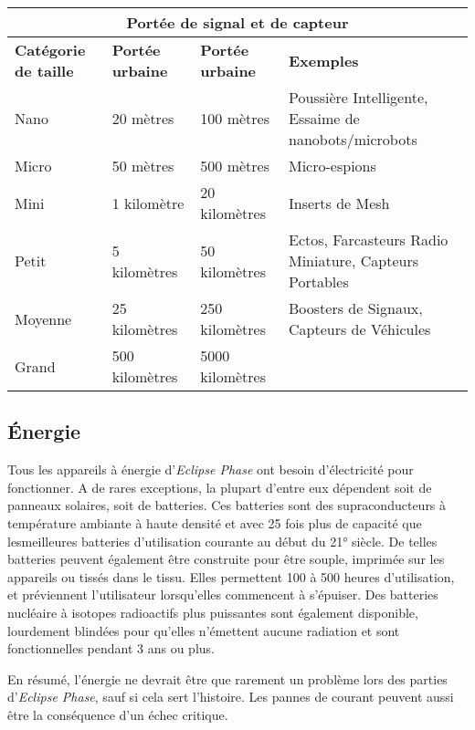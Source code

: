 \begin{table} \begin{tabularx}{\textwidth}{|l|l|l|X|} \hline

\multicolumn{4}{|c|}{\textbf{Portée de signal et de capteur}}	\\ \hline

\textbf{Catégorie de taille}	&\textbf{Portée urbaine}	&\textbf{Portée urbaine}	&\textbf{Exemples} \\ \hline

Nano &20 mètres &100 mètres	&Poussière Intelligente, Essaime de nanobots/microbots \\ Micro	&50 mètres	&500 mètres	&Micro-espions \\ Mini	&1 kilomètre	&20 kilomètres	&Inserts de Mesh\\ Petit	&5 kilomètres	&50 kilomètres	&Ectos, Farcasteurs Radio Miniature, Capteurs Portables \\ Moyenne	&25 kilomètres	&250 kilomètres	&Boosters de Signaux, Capteurs de Véhicules \\ Grand	&500 kilomètres	&5000 kilomètres	&\\ \hline

\end{tabularx} \label{tab:radio-sensor-ranges} \end{table} 

\subsection{Énergie} \label{sec:power} 

Tous les appareils à énergie d'\emph{Eclipse Phase} ont besoin d'électricité pour fonctionner. A de rares exceptions, la plupart d'entre eux dépendent soit de panneaux solaires, soit de batteries. Ces batteries sont des supraconducteurs à température ambiante à haute densité et avec 25 fois plus de capacité que lesmeilleures batteries d'utilisation courante au début du 21° siècle. De telles batteries peuvent également être construite pour être souple, imprimée sur les appareils ou tissés dans le tissu. Elles permettent 100 à 500 heures d'utilisation, et préviennent l'utilisateur lorsqu'elles commencent à s'épuiser. Des batteries nucléaire à isotopes radioactifs plus puissantes sont également disponible, lourdement blindées pour qu'elles n'émettent aucune radiation et sont fonctionnelles pendant 3 ans ou plus. 

En résumé, l'énergie ne devrait être que rarement un problème lors des parties d'\emph{Eclipse Phase}, sauf si cela sert l'histoire. Les pannes de courant peuvent aussi être la conséquence d'un échec critique. 

